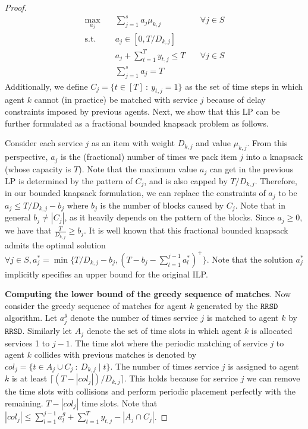 \documentclass[letterpaper,11pt]{article}
\begin{document}
\begin{proof}
    \begin{align*}
        \max_{a_{j}}\quad & \sum^{s}_{j=1}a_{j}\mu_{k,j} \quad &\forall j \in S  \\
        \text{s.t. }\quad &  a_{j} \in [0, T/ D_{k, j}] \\
        \quad & a_{j} + \sum^{T}_{t=1}y_{t, j} \leq T \quad &\forall j \in S \\
        & \sum^{s}_{j=1}a_{j} = T
    \end{align*}
    Additionally, we define $C_{j} = \{t \in [T] \: : \: y_{t, j} = 1\}$ as the set of time steps in which agent $k$ cannot (in practice) be matched with service $j$ because of delay constraints imposed by previous agents. 
    Next, we show that this LP can be further formulated as a fractional bounded knapsack problem as follows.
    
    Consider each service $j$ as an item with weight $D_{k,j}$ and value $\mu_{k,j}$. From this perspective, $a_j$ is the (fractional) number of times we pack item $j$ into a knapsack (whose capacity is $T$). Note that the maximum value $a_j$ can get in the previous LP is determined by the pattern of $C_j$, and is also capped by $T/ D_{k, j}$.
    Therefore, in our bounded knapsack formulation, we can replace the constraints of $a_j$ to be $a_j \leq T/ D_{k, j} - b_j$ where $b_j$ is the number of blocks caused by $C_j$. Note that in general $b_j \neq |C_j|$, as it heavily depends on the pattern of the blocks. 
    Since $a_j \geq 0$, we have that $\frac{T}{D_{k,j}} \geq b_j$.
    It is well known that this fractional  bounded knapsack admits the optimal solution $\forall j \in S, a^{*}_{j} = \min \{T/D_{k,j} - b_j, (T - b_j - \sum_{l=1}^{j-1}a_{l}^{*})^{+}\}$. Note that the solution $a^{*}_{j}$ implicitly specifies an upper bound for the original ILP.
    
     \textbf{Computing the lower bound of the greedy sequence of matches}. Now consider the greedy sequence of matches for agent $k$ generated by the $\texttt{RRSD}$ algorithm. Let $a^{g}_{j}$ denote the number of times service $j$ is matched to agent $k$ by $\texttt{RRSD}$. Similarly let $A_{j}$ denote the set of time slots in which agent $k$ is allocated services 1 to $j-1$. The time slot where the periodic matching of service $j$ to agent $k$ collides with previous matches is denoted by $col_{j} = \{t \in A_{j}\cup C_{j} \: : \: D_{k, j}\;|\;t \}$. The number of times service $j$ is assigned to agent $k$ is at least $\lceil (T - |col_{j}|)/D_{k, j}\rceil$. This holds because for service $j$ we can remove the time slots with collisions and perform periodic placement perfectly with the remaining. $T - |col_{j}|$ time slots. Note that $|col_{j}| \leq \sum^{j-1}_{l=1}a^{g}_{l} + \sum^{T}_{t=1}y_{t, j} - |A_{j}\cap C_{j}|$.
    

\end{proof}
\end{document}
